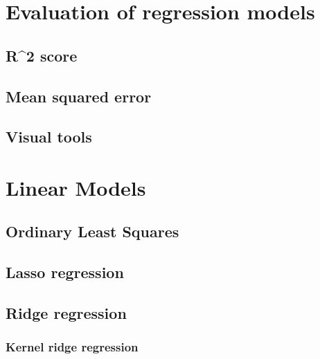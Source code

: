 \documentclass[
]{book}
\begin{document}
\hypertarget{evaluation-of-regression-models}{%
\section{Evaluation of regression models}\label{evaluation-of-regression-models}}

\hypertarget{r2-score}{%
\subsection{R\^{}2 score}\label{r2-score}}

\hypertarget{mean-squared-error}{%
\subsection{Mean squared error}\label{mean-squared-error}}

\hypertarget{visual-tools}{%
\subsection{Visual tools}\label{visual-tools}}

\hypertarget{linear-models}{%
\section{Linear Models}\label{linear-models}}

\hypertarget{ordinary-least-squares}{%
\subsection{Ordinary Least Squares}\label{ordinary-least-squares}}

\hypertarget{lasso-regression}{%
\subsection{Lasso regression}\label{lasso-regression}}

\hypertarget{ridge-regression}{%
\subsection{Ridge regression}\label{ridge-regression}}

\hypertarget{kernel-ridge-regression}{%
\subsubsection{Kernel ridge regression}\label{kernel-ridge-regression}}
\end{document}
